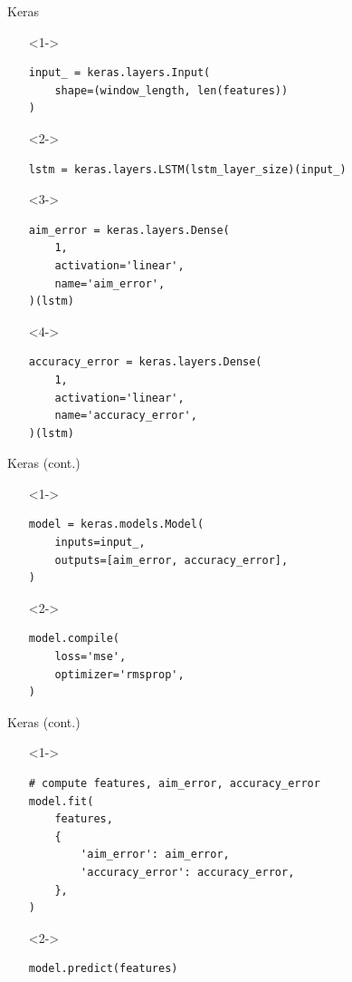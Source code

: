 \documentclass[table]{beamer}
\begin{document}
\begin{frame}[fragile]{Keras}
  \begin{itemize}
  \item[]<1-> \begin{verbatim}
input_ = keras.layers.Input(
    shape=(window_length, len(features))
)
    \end{verbatim}
  \item[]<2-> \begin{verbatim}
lstm = keras.layers.LSTM(lstm_layer_size)(input_)
    \end{verbatim}
  \item[]<3-> \begin{verbatim}
aim_error = keras.layers.Dense(
    1,
    activation='linear',
    name='aim_error',
)(lstm)
    \end{verbatim}
  \item[]<4-> \begin{verbatim}
accuracy_error = keras.layers.Dense(
    1,
    activation='linear',
    name='accuracy_error',
)(lstm)
    \end{verbatim}
  \end{itemize}
\end{frame}

\begin{frame}[fragile]{Keras (cont.)}
  \begin{itemize}
  \item[]<1-> \begin{verbatim}
model = keras.models.Model(
    inputs=input_,
    outputs=[aim_error, accuracy_error],
)
    \end{verbatim}
  \item[]<2-> \begin{verbatim}
model.compile(
    loss='mse',
    optimizer='rmsprop',
)
    \end{verbatim}
  \end{itemize}
\end{frame}

\begin{frame}[fragile]{Keras (cont.)}
  \begin{itemize}
  \item[]<1-> \begin{verbatim}
# compute features, aim_error, accuracy_error
model.fit(
    features,
    {
        'aim_error': aim_error,
        'accuracy_error': accuracy_error,
    },
)
    \end{verbatim}
  \item[]<2-> \begin{verbatim}
model.predict(features)
    \end{verbatim}
  \end{itemize}
\end{frame}
\end{document}
